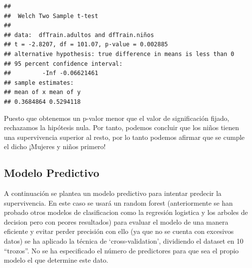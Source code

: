 \documentclass[
]{article}
\newenvironment{Shaded}{\begin{snugshade}}{\end{snugshade}}
\newcommand{\CommentTok}[1]{\textcolor[rgb]{0.50,0.62,0.50}{#1}}
\newcommand{\DataTypeTok}[1]{\textcolor[rgb]{0.87,0.87,0.75}{#1}}
\newcommand{\DecValTok}[1]{\textcolor[rgb]{0.86,0.86,0.80}{#1}}
\newcommand{\KeywordTok}[1]{\textcolor[rgb]{0.94,0.87,0.69}{#1}}
\newcommand{\NormalTok}[1]{\textcolor[rgb]{0.80,0.80,0.80}{#1}}
\newcommand{\OperatorTok}[1]{\textcolor[rgb]{0.94,0.94,0.82}{#1}}
\newcommand{\StringTok}[1]{\textcolor[rgb]{0.80,0.58,0.58}{#1}}
\begin{document}
\begin{verbatim}
## 
##  Welch Two Sample t-test
## 
## data:  dfTrain.adultos and dfTrain.niños
## t = -2.8207, df = 101.07, p-value = 0.002885
## alternative hypothesis: true difference in means is less than 0
## 95 percent confidence interval:
##         -Inf -0.06621461
## sample estimates:
## mean of x mean of y 
## 0.3684864 0.5294118
\end{verbatim}

Puesto que obtenemos un p-valor menor que el valor de significación
fijado, rechazamos la hipótesis nula. Por tanto, podemos concluir que
los niños tienen una supervivencia superior al resto, por lo tanto
podemos afirmar que se cumple el dicho ¡Mujeres y niños primero!

\hypertarget{modelo-predictivo}{%
\subsection{Modelo Predictivo}\label{modelo-predictivo}}

A continuación se plantea un modelo predictivo para intentar predecir la
supervivencia. En este caso se usará un random forest (anteriormente se
han probado otros modelos de clasificacion como la regresión logistica y
los arboles de decision pero con peores resultados) para evaluar el
modelo de una manera eficiente y evitar perder precisión con ello (ya
que no se cuenta con excesivos datos) se ha aplicado la técnica de
`cross-validation', dividiendo el dataset en 10 ``trozos''. No se ha
especificado el número de predictores para que sea el propio modelo el
que determine este dato.

\begin{Shaded}
\end{Shaded}
\end{document}
